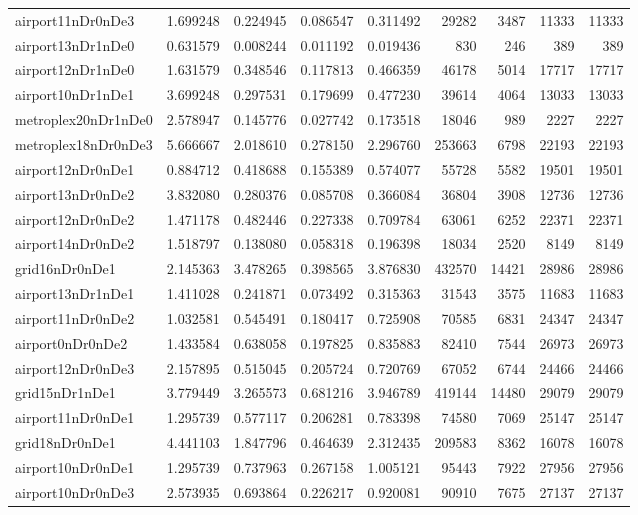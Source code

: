 \begin{longtable}{|l|r|r|r|r|r|r|r|r|}
airport11nDr0nDe3 & 1.699248 & 0.224945 & 0.086547 & 0.311492 & 29282 & 3487 & 11333 & 11333 \\
airport13nDr1nDe0 & 0.631579 & 0.008244 & 0.011192 & 0.019436 & 830 & 246 & 389 & 389 \\
airport12nDr1nDe0 & 1.631579 & 0.348546 & 0.117813 & 0.466359 & 46178 & 5014 & 17717 & 17717 \\
airport10nDr1nDe1 & 3.699248 & 0.297531 & 0.179699 & 0.477230 & 39614 & 4064 & 13033 & 13033 \\
metroplex20nDr1nDe0 & 2.578947 & 0.145776 & 0.027742 & 0.173518 & 18046 & 989 & 2227 & 2227 \\
metroplex18nDr0nDe3 & 5.666667 & 2.018610 & 0.278150 & 2.296760 & 253663 & 6798 & 22193 & 22193 \\
airport12nDr0nDe1 & 0.884712 & 0.418688 & 0.155389 & 0.574077 & 55728 & 5582 & 19501 & 19501 \\
airport13nDr0nDe2 & 3.832080 & 0.280376 & 0.085708 & 0.366084 & 36804 & 3908 & 12736 & 12736 \\
airport12nDr0nDe2 & 1.471178 & 0.482446 & 0.227338 & 0.709784 & 63061 & 6252 & 22371 & 22371 \\
airport14nDr0nDe2 & 1.518797 & 0.138080 & 0.058318 & 0.196398 & 18034 & 2520 & 8149 & 8149 \\
grid16nDr0nDe1 & 2.145363 & 3.478265 & 0.398565 & 3.876830 & 432570 & 14421 & 28986 & 28986 \\
airport13nDr1nDe1 & 1.411028 & 0.241871 & 0.073492 & 0.315363 & 31543 & 3575 & 11683 & 11683 \\
airport11nDr0nDe2 & 1.032581 & 0.545491 & 0.180417 & 0.725908 & 70585 & 6831 & 24347 & 24347 \\
airport0nDr0nDe2 & 1.433584 & 0.638058 & 0.197825 & 0.835883 & 82410 & 7544 & 26973 & 26973 \\
airport12nDr0nDe3 & 2.157895 & 0.515045 & 0.205724 & 0.720769 & 67052 & 6744 & 24466 & 24466 \\
grid15nDr1nDe1 & 3.779449 & 3.265573 & 0.681216 & 3.946789 & 419144 & 14480 & 29079 & 29079 \\
airport11nDr0nDe1 & 1.295739 & 0.577117 & 0.206281 & 0.783398 & 74580 & 7069 & 25147 & 25147 \\
grid18nDr0nDe1 & 4.441103 & 1.847796 & 0.464639 & 2.312435 & 209583 & 8362 & 16078 & 16078 \\
airport10nDr0nDe1 & 1.295739 & 0.737963 & 0.267158 & 1.005121 & 95443 & 7922 & 27956 & 27956 \\
airport10nDr0nDe3 & 2.573935 & 0.693864 & 0.226217 & 0.920081 & 90910 & 7675 & 27137 & 27137 \\

\end{longtable}
